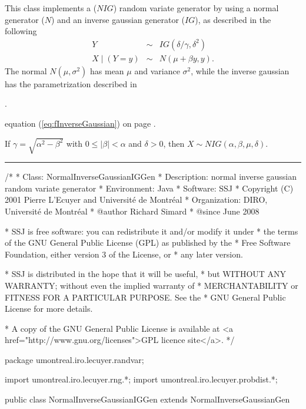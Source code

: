 

This class implements a \nig{} (${NIG}$) random variate generator by
using a normal generator ($N$) and an inverse gaussian generator ($IG$),
 as described in the following \cite{fWEB03a,fKAL07a}
\begin {eqnarray}
    Y  &\sim& {IG}(\delta/\gamma, \delta^2)    \label{nig2} \\
    X \mid (Y=y)  &\sim& N(\mu + \beta y, y).  \nonumber
\end {eqnarray}
The normal $N(\mu, \sigma^2)$ has mean $\mu$ and variance $\sigma^2$, while
the inverse gaussian has the parametrization described in%
\begin{htmlonly}
.
\end{htmlonly}
\begin{latexonly}%
equation (\ref{eq:fInverseGaussian}) on page \pageref{eq:fInverseGaussian}.
\end{latexonly}
If $\gamma = \sqrt{\alpha^2 - \beta^2}$ with $0 \le |\beta| < \alpha$ and
$\delta >0$, then $X \sim {NIG}(\alpha, \beta, \mu, \delta)$. 

\bigskip\hrule

\begin{code}
\begin{hide}
/*
 * Class:        NormalInverseGaussianIGGen
 * Description:  normal inverse gaussian random variate generator
 * Environment:  Java
 * Software:     SSJ 
 * Copyright (C) 2001  Pierre L'Ecuyer and Université de Montréal
 * Organization: DIRO, Université de Montréal
 * @author       Richard Simard
 * @since        June 2008

 * SSJ is free software: you can redistribute it and/or modify it under
 * the terms of the GNU General Public License (GPL) as published by the
 * Free Software Foundation, either version 3 of the License, or
 * any later version.

 * SSJ is distributed in the hope that it will be useful,
 * but WITHOUT ANY WARRANTY; without even the implied warranty of
 * MERCHANTABILITY or FITNESS FOR A PARTICULAR PURPOSE.  See the
 * GNU General Public License for more details.

 * A copy of the GNU General Public License is available at
   <a href="http://www.gnu.org/licenses">GPL licence site</a>.
 */
\end{hide}
package umontreal.iro.lecuyer.randvar;\begin{hide}
import umontreal.iro.lecuyer.rng.*;
import umontreal.iro.lecuyer.probdist.*;
\end{hide}

public class NormalInverseGaussianIGGen extends NormalInverseGaussianGen \begin{hide} {
   private NormalGen genN;
   private InverseGaussianGen genIG;
\end{hide}\end{code}

